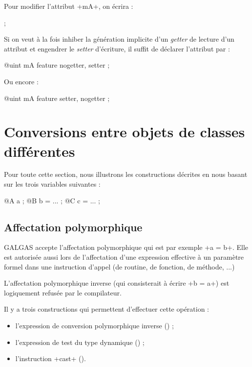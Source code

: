 Pour modifier l'attribut \ggs+mA+, on écrira :

\begin{galgas}
[!?b setMA !12] ;
\end{galgas}

Si on veut à la fois inhiber la génération implicite d'un \emph{getter} de lecture d'un attribut et engendrer le \emph{setter} d'écriture, il suffit de déclarer l'attribut par :

\begin{galgas}
  @uint mA feature nogetter, setter ;
\end{galgas}

Ou encore :

\begin{galgas}
  @uint mA feature setter, nogetter ;
\end{galgas}












\section{Conversions entre objets de classes différentes}

Pour toute cette section, nous illustrons les constructions décrites en nous basant sur les trois variables suivantes :

\begin{galgas}
@A a ;
@B b = ... ;
@C c = ... ;
\end{galgas}

\subsection{Affectation polymorphique}

GALGAS accepte l'affectation polymorphique qui est par exemple \ggs+a = b+. Elle est autorisée aussi lors de l'affectation d'une expression effective à un paramètre formel dans une instruction d'appel (de routine, de fonction, de méthode, ...)

L'affectation polymorphique inverse (qui consisterait à écrire \ggs+b = a+) est logiquement refusée par le compilateur.

Il y a trois constructions qui permettent d'effectuer cette opération :
\begin{itemize}
  \item l'expression de conversion polymorphique inverse () ;
  \item l'expression de test du type dynamique () ;
  \item l'instruction \ggs+cast+ ().
\end{itemize}

